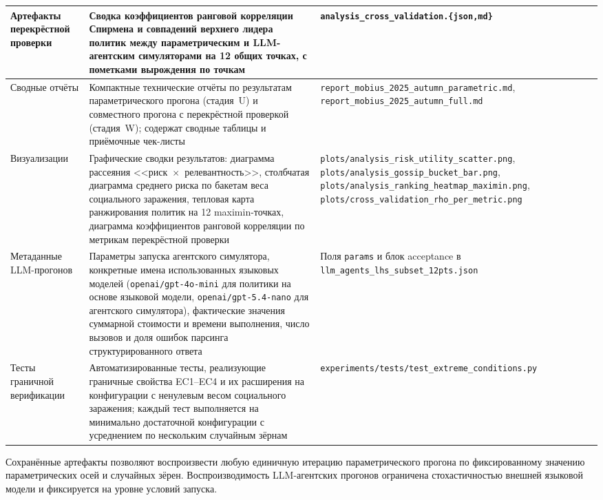 \begin{footnotesize}
\begin{longtable}{|>{\raggedright\arraybackslash}p{3.0cm}|>{\raggedright\arraybackslash}p{5.8cm}|>{\raggedright\arraybackslash}p{5.7cm}|}
\hline
Артефакты перекрёстной проверки & Сводка коэффициентов ранговой корреляции Спирмена и совпадений верхнего лидера политик между параметрическим и LLM-агентским симуляторами на 12 общих точках, с пометками вырождения по точкам & \texttt{analysis\_cross\_validation.\{json,md\}} \\
\hline
Сводные отчёты & Компактные технические отчёты по результатам параметрического прогона (стадия~U) и совместного прогона с перекрёстной проверкой (стадия~W); содержат сводные таблицы и приёмочные чек-листы & \texttt{report\_mobius\_2025\_autumn\_parametric.md}, \texttt{report\_mobius\_2025\_autumn\_full.md} \\
\hline
Визуализации & Графические сводки результатов: диаграмма рассеяния <<риск~$\times$~релевантность>>, столбчатая диаграмма среднего риска по бакетам веса социального заражения, тепловая карта ранжирования политик на 12 maximin-точках, диаграмма коэффициентов ранговой корреляции по метрикам перекрёстной проверки & \texttt{plots/analysis\_risk\_utility\_scatter.png}, \texttt{plots/analysis\_gossip\_bucket\_bar.png}, \texttt{plots/analysis\_ranking\_heatmap\_maximin.png}, \texttt{plots/cross\_validation\_rho\_per\_metric.png} \\
\hline
Метаданные LLM-прогонов & Параметры запуска агентского симулятора, конкретные имена использованных языковых моделей (\texttt{openai/gpt-4o-mini} для политики на основе языковой модели, \texttt{openai/gpt-5.4-nano} для агентского симулятора), фактические значения суммарной стоимости и времени выполнения, число вызовов и доля ошибок парсинга структурированного ответа & Поля \texttt{params} и блок acceptance в \texttt{llm\_agents\_lhs\_subset\_12pts.json} \\
\hline
Тесты граничной верификации & Автоматизированные тесты, реализующие граничные свойства EC1--EC4 и их расширения на конфигурации с ненулевым весом социального заражения; каждый тест выполняется на минимально достаточной конфигурации с усреднением по нескольким случайным зёрнам & \texttt{experiments/tests/test\_extreme\_conditions.py} \\
\end{longtable}
\end{footnotesize}
\endgroup

Сохранённые артефакты позволяют воспроизвести любую единичную итерацию параметрического прогона по фиксированному значению параметрических осей и случайных зёрен. Воспроизводимость LLM-агентских прогонов ограничена стохастичностью внешней языковой модели и фиксируется на уровне условий запуска.
